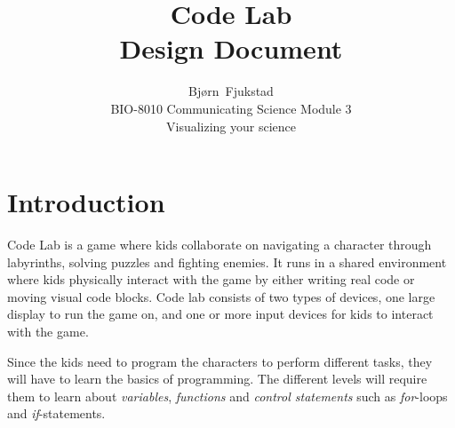 \documentclass[11pt,journal,compsoc]{IEEEtran}
\begin{document}
\title{Code Lab \\ Design Document}
\author{Bjørn~Fjukstad \\ BIO-8010 Communicating Science Module 3\\ Visualizing
your science} 
\maketitle
\vspace{-15mm}
\section{Introduction} 
Code Lab is a game where kids collaborate on navigating a character 
through labyrinths, solving puzzles and fighting enemies. It runs in a shared
environment where kids physically interact with the game by either writing
real code or moving visual code blocks. Code lab consists of two types of 
devices, one large display to run the game on, and one or more input devices for
kids to interact with the game. 

Since the kids need to program the characters to perform different tasks, they
will have to learn the basics of programming. The different levels will require
them to learn about \emph{variables}, \emph{functions} and \emph{control
statements} such as \emph{for}-loops and \emph{if}-statements. 
\end{document}
